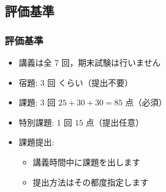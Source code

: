 \subsection{評価基準}
\begin{frame}
\frametitle{評価基準}
  \begin{itemize}
\item 講義は全 7 回，期末試験は行いません
\item 宿題: 3 回 くらい（提出不要）
\item 課題: 3 回 \(25+30+30=85\) 点（必須）
\item 特別課題: 1 回 \(15\) 点（提出任意）
\item 課題提出: 
    \begin{itemize}
\item 講義時間中に課題を出します
\item 提出方法はその都度指定します
    \end{itemize}
  \end{itemize}
\end{frame}
%
%
